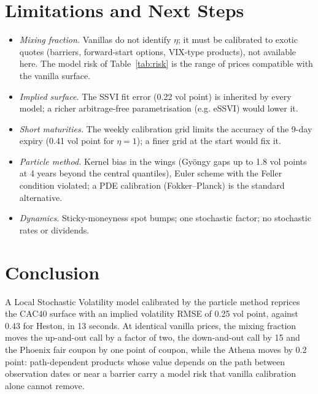 \documentclass[11pt,a4paper]{article}
\begin{document}
\section{Limitations and Next Steps}\label{sec:limitations}
\begin{itemize}
\item \emph{Mixing fraction.} Vanillas do not identify $\eta$; it must be calibrated to exotic quotes (barriers,
forward-start options, VIX-type products), not available here. The model risk of Table~\ref{tab:risk} is the range
of prices compatible with the vanilla surface.
\item \emph{Implied surface.} The SSVI fit error (0.22 vol point) is inherited by every model; a richer arbitrage-free
parametrisation (e.g. eSSVI) would lower it.
\item \emph{Short maturities.} The weekly calibration grid limits the accuracy of the 9-day expiry (0.41 vol point
for $\eta = 1$); a finer grid at the start would fix it.
\item \emph{Particle method.} Kernel bias in the wings (Gyöngy gaps up to 1.8 vol points at 4 years beyond the
central quantiles), Euler scheme with the Feller condition violated; a PDE calibration (Fokker--Planck) is the
standard alternative.
\item \emph{Dynamics.} Sticky-moneyness spot bumps; one stochastic factor; no stochastic rates or dividends.
\end{itemize}

\section{Conclusion}
A Local Stochastic Volatility model calibrated by the particle method reprices the CAC40 surface with an implied
volatility RMSE of 0.25 vol point, against 0.43 for Heston, in 13 seconds. At identical vanilla prices, the mixing
fraction moves the up-and-out call by a factor of two, the down-and-out call by 15 and the Phoenix fair coupon by one
point of coupon, while the Athena moves by 0.2 point: path-dependent products whose value depends on the path between
observation dates or near a barrier carry a model risk that vanilla calibration alone cannot remove.

\appendix
\end{document}

